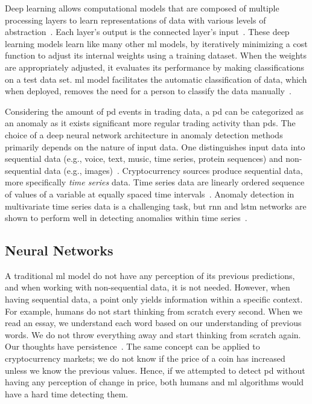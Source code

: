 Deep learning allows computational models that are composed of multiple processing layers to learn representations of data with various levels of abstraction~\cite{lecun2015deep}. Each layer's output is the connected layer's input~\cite{mike_voets}. These deep learning models learn like many other \ac{ml} models, by iteratively minimizing a cost function to adjust its internal weights using a training dataset. When the weights are appropriately adjusted, it evaluates its performance by making classifications on a test data set. \ac{ml} model facilitates the automatic classification of data, which when deployed, removes the need for a person to classify the data manually~\cite{mike_voets}.

Considering the amount of \ac{pd} events in trading data, a \ac{pd} can be categorized as an anomaly as it exists significant more regular trading activity than \acp{pd}. The choice of a deep neural network architecture in anomaly detection methods primarily depends on the nature of input data. One distinguishes input data into sequential data (e.g., voice, text, music, time series, protein sequences) and non-sequential data (e.g., images)~\cite{dl_anomaly}. Cryptocurrency sources produce sequential data, more specifically \emph{time series} data. Time series data are linearly ordered sequence of values of a variable at equally spaced time intervals~\cite{stat_handbook}. Anomaly detection in multivariate time series data is a challenging task, but \ac{rnn} and \ac{lstm} networks are shown to perform well in detecting anomalies within time series~\cite{dl_anomaly}.

\subsection{Neural Networks}\label{sec:nn}
A traditional \ac{ml} model do not have any perception of its previous predictions, and when working with non-sequential data, it is not needed. However, when having sequential data, a point only yields information within a specific context. For example, humans do not start thinking from scratch every second. When we read an essay, we understand each word based on our understanding of previous words. We do not throw everything away and start thinking from scratch again. Our thoughts have persistence~\cite{colah}. The same concept can be applied to cryptocurrency markets; we do not know if the price of a coin has increased unless we know the previous values. Hence, if we attempted to detect \ac{pd} without having any perception of change in price, both humans and \ac{ml} algorithms would have a hard time detecting them.

